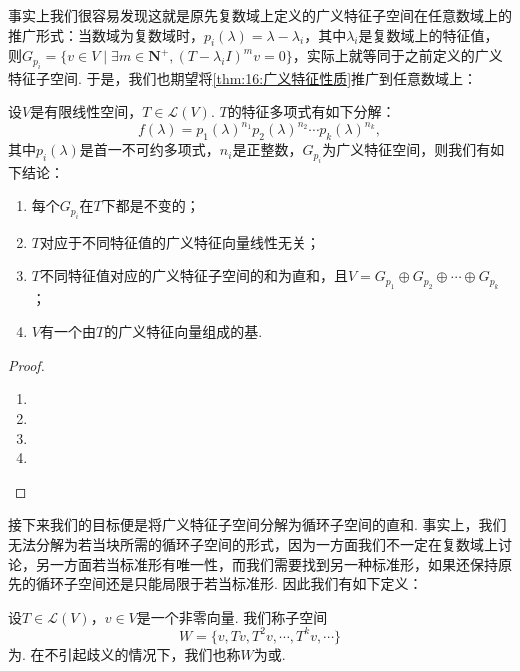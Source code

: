 事实上我们很容易发现这就是原先复数域上定义的广义特征子空间在任意数域上的推广形式：当数域为复数域时，$p_i(\lambda)=\lambda-\lambda_i$，其中$\lambda_i$是复数域上的特征值，则$G_{p_i}=\{v\in V\mid\exists m\in\mathbf{N}^+,(T-\lambda_iI)^mv=0\}$，实际上就等同于之前定义的广义特征子空间. 于是，我们也期望将\autoref{thm:16:广义特征性质}推广到任意数域上：
\begin{theorem} \label{thm:19:推广广义特征性质}
    设$V$是有限线性空间，$T\in \mathcal{L}(V)$. $T$的特征多项式有如下分解：
    \[f(\lambda)=p_1(\lambda)^{n_1}p_2(\lambda)^{n_2}\cdots p_k(\lambda)^{n_k},\]
    其中$p_i(\lambda)$是首一不可约多项式，$n_i$是正整数，$G_{p_i}$为广义特征空间，则我们有如下结论：
    \begin{enumerate}[label=(\arabic*)]
        \item 每个$G_{p_i}$在$T$下都是不变的；
        \item $T$对应于不同特征值的广义特征向量线性无关；
        \item $T$不同特征值对应的广义特征子空间的和为直和，且$V=G_{p_1}\oplus G_{p_2}\oplus\cdots\oplus G_{p_k}$；
        \item $V$有一个由$T$的广义特征向量组成的基.
    \end{enumerate}
\end{theorem}
\begin{proof}
    \begin{enumerate}
        \item
        \item
        \item
        \item
    \end{enumerate}
\end{proof}

接下来我们的目标便是将广义特征子空间分解为循环子空间的直和. 事实上，我们无法分解为若当块所需的循环子空间的形式，因为一方面我们不一定在复数域上讨论，另一方面若当标准形有唯一性，而我们需要找到另一种标准形，如果还保持原先的循环子空间还是只能局限于若当标准形. 因此我们有如下定义：
\begin{definition}
    设$T\in\mathcal{L}(V)$，$v\in V$是一个非零向量. 我们称子空间
    \[W=\{v,Tv,T^2v,\cdots,T^kv,\cdots\}\]
    为. 在不引起歧义的情况下，我们也称$W$为或.
\end{definition}

